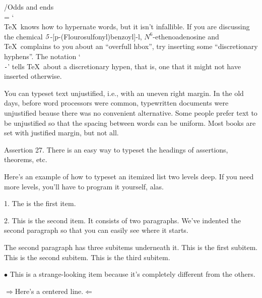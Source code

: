 /{Odds and ends}
\chardef \\ = `\\ %
\footline{\hfil{\tenit -- \folio\ --}\hfil} %
\TeX\ knows how to hypernate words, but it isn't infallible.  If you are discussing the chemical
${\it 5}$-[p-(Flouro\-sul\-fonyl)ben\-zoyl]-l,%
$N^6$-ethe\-no\-adeno\-sine and \TeX\ complains to you about an ``overfull hbox'', try inserting some 
``discretionary hyphens''.  The notation `{\tt \\-}' tells \TeX\ about a dis\-cre\-tion\-ary hypen, 
that is, one that it might not have inserted otherwise.
\medskip
{\raggedright You can typeset text unjustified, i.e., with an uneven right margin.  In the old days,
before word processors were common, typewritten documents were unjustified beause there was no
convenient alternative.  Some people prefer text to be unjustified so that the spacing between words 
can be uniform.  Most books are set with justified margin, but not all.\par}

\proclaim Assertion 27.  There is an easy way to typeset the headings of assertions, theorems, etc.

Here's an example of how to typeset an itemized list two levels deep.  If you need more levels,
you'll have to program it yourself, alas.
\smallskip
\item {1.} The is the first item.
\item {2.} This is the second item.  It consists of two paragraphs.  We've
indented the second paragraph so that you can easily see where it starts.
\item {} \indent The second paragraph has three subitems underneath it.
 This is the first subitem.
 This is the second subitem.
 This is the third subitem.
\item{$\bullet$} This is a strange-looking item because it's completely different from the others.
\smallskip
{}
\centerline{$\Rightarrow$Here's a centered line.$\Leftarrow$}
